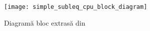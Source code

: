 \documentclass[../main.tex]{subfiles}
\begin{document}
\cite{subleqcpu}
\cite{inkel}

\begin{figure}[h]
    \centering
    \texttt{[image: simple\_subleq\_cpu\_block\_diagram]}
    \caption{Diagramă bloc extrasă din \cite{subleqcpu}}
    \label{fig:simple_subleq_cpu_block_diagram}
\end{figure}
\end{document}
